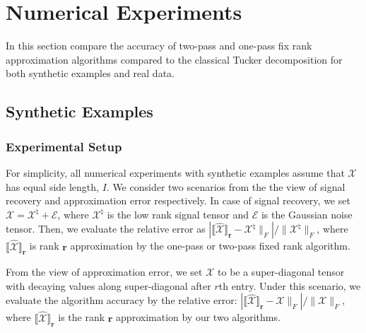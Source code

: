 \section{Numerical Experiments}
In this section compare the accuracy of two-pass and one-pass fix rank approximation algorithms compared to the classical Tucker decomposition for both synthetic examples and real data. 

\subsection{Synthetic Examples} 
\subsubsection{Experimental Setup}
For simplicity, all numerical experiments with synthetic examples assume that $\mathscr{X}$ has equal side length, $I$. We consider two scenarios from the the view of signal recovery and approximation error respectively. In case of signal recovery, we set $\mathscr{X} = \mathscr{X}^\natural+\mathscr{E}$, where $\mathscr{X}^\natural$ is the low rank signal tensor and $\mathscr{E}$ is the Gaussian noise tensor. Then, we evaluate the relative error as $\left|\llbracket \hat{\mathscr{X}} \rrbracket_\mathbf{r} -  \mathscr{X}^\natural\|_F\right|/{\|\mathscr{X}^\natural\|_F}$, where $\llbracket \hat{\mathscr{X}} \rrbracket_\mathbf{r}$ is rank $\mathbf{r}$ approximation by the one-pass or two-pass fixed rank algorithm.

From the view of approximation error, we set $\mathscr{X}$ to be a super-diagonal tensor with decaying values along super-diagonal after $r$th entry. Under this scenario, we evaluate the algorithm accuracy by the relative error: $\left| \llbracket \hat{\mathscr{X}}\rrbracket_\mathbf{r} -  \mathscr{X} \|_F\right|/\|\mathscr{X}\|_F$,
where $\llbracket \hat{\mathscr{X}} \rrbracket_\mathbf{r}$ is the rank $\mathbf{r}$ approximation by our two algorithms. 

